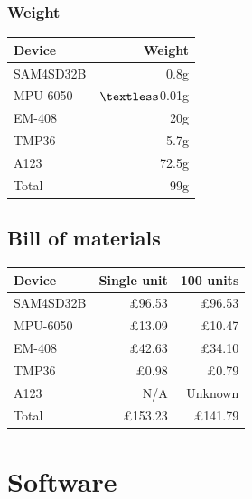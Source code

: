 \documentclass[a4paper, twoside]{article}
\begin{document}
\subsubsection{Weight}
\begin{tabular}{|l|r|}
	\hline
	\textbf{Device} & \textbf{Weight} \\
	\hline
	\hline
	SAM4SD32B & 0.8g \\
	MPU-6050 & $\textless$0.01g \\
	EM-408 & 20g \\
	TMP36 & 5.7g \\
	A123 & 72.5g \\
	\hline
	\hline
	Total & 99g \\
	\hline
\end{tabular}

\subsection{Bill of materials}

\begin{tabular}{|l|r|r|}
	\hline
	\textbf{Device} & \textbf{Single unit} & \textbf{100 units} \\
	\hline
	\hline
	SAM4SD32B\footnotemark[2] & \pounds96.53 & \pounds96.53 \\
	MPU-6050 & \pounds13.09 & \pounds10.47 \\
	EM-408 & \pounds42.63 & \pounds34.10 \\
	TMP36 & \pounds0.98 & \pounds0.79 \\
	A123\footnotemark[3] & N/A & Unknown \\
	\hline
	\hline
	Total & \pounds153.23 & \pounds141.79 \\
	\hline
\end{tabular}

\clearpage
\section{Software}
\end{document}
